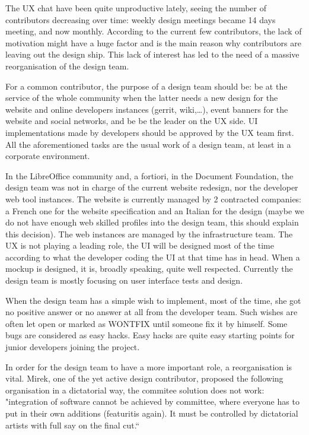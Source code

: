 \documentclass{article}
\begin{document}
The UX chat have been quite unproductive lately, seeing the number of contributors decreasing over time: weekly design meetings became 14 days meeting, and now monthly.
According to the current few contributors, the lack of motivation might have a huge factor and is the main reason why contributors are leaving out the design ship. This lack of interest has led to the need of a massive reorganisation of the design team.

For a common contributor, the purpose of a design team should be: be at the service of the whole community when the latter needs a new design for the website and online developers instances (gerrit, wiki,\ldots), event banners for the website and social networks, and be be the leader on the UX side. UI implementations made by developers should be approved by the UX team first. All the aforementioned tasks are the usual work of a design team, at least in a corporate environment.

In the LibreOffice community and, a fortiori, in the Document Foundation, the design team was not in charge of the current website redesign, nor the developer web tool instances. The website is currently managed by 2 contracted companies: a French one for the website specification and an Italian for the design (maybe we do not have enough web skilled profiles into the design team, this should explain this decision). The web instances are managed by the infrastructure team. The UX is not playing a leading role\cite{uxFiasco}, the UI will be designed most of the time according to what the developer coding the UI at that time has in head. When a mockup is designed, it is, broadly speaking, quite well respected\cite{startCenter}. Currently the design team is mostly focusing on user interface tests and design.

When the design team has a simple wish to implement, most of the time, she got no positive answer\cite{noPositiveAnswer} or no answer at all from the developer team. Such wishes are often let open or marked as WONTFIX until someone fix it by himself. Some bugs are considered as easy hacks\cite{easyHacks}. Easy hacks are quite easy starting points for junior developers joining the project. 

In order for the design team to have a more important role, a reorganisation is vital. Mirek, one of the yet active design contributor, proposed the following organisation in a dictatorial way, the commitee solution does not work: "integration of software cannot be achieved by committee, where everyone has to put in
their own additions (featuritis again). It must be controlled by dictatorial artists with full say on the final cut.``
\end{document}
